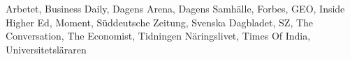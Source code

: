 Arbetet, Business Daily, Dagens Arena, Dagens Samhälle, Forbes, GEO, Inside Higher Ed, Moment, Süddeutsche Zeitung, Svenska Dagbladet, SZ, The Conversation, The Economist, Tidningen Näringslivet, Times Of India, Universitetsläraren%
